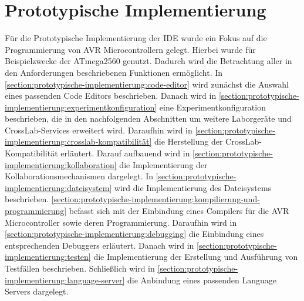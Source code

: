 \chapter{Prototypische Implementierung}\label{section:prototypische-implementierung}

Für die Prototypische Implementierung der IDE wurde ein Fokus auf die Programmierung von AVR Microcontrollern \cite{noauthor_avr_nodate} gelegt. Hierbei wurde für Beispielzwecke der ATmega2560 \cite{noauthor_atmega2560_nodate} genutzt. Dadurch wird die Betrachtung aller in den Anforderungen beschriebenen Funktionen ermöglicht. In \autoref{section:prototypische-implementierung:code-editor} wird zunächst die Auswahl eines passenden Code Editors beschrieben. Danach wird in \autoref{section:prototypische-implementierung:experimentkonfiguration} eine Experimentkonfiguration beschrieben, die in den nachfolgenden Abschnitten um weitere Laborgeräte und CrossLab-Services erweitert wird. Daraufhin wird in \autoref{section:prototypische-implementierung:crosslab-kompatibilität} die Herstellung der CrossLab-Kompatibilität erläutert. Darauf aufbauend wird in \autoref{section:prototypische-implementierung:kollaboration} die Implementierung der Kollaborationsmechanismen dargelegt. In \autoref{section:prototypische-implementierung:dateisystem} wird die Implementierung des Dateisystems beschrieben. \autoref{section:prototypische-implementierung:kompilierung-und-programmierung} befasst sich mit der Einbindung eines Compilers für die AVR Microcontroller sowie deren Programmierung. Daraufhin wird in \autoref{section:prototypische-implementierung:debugging} die Einbindung eines entsprechenden Debuggers erläutert. Danach wird in \autoref{section:prototypische-implementierung:testen} die Implementierung der Erstellung und Ausführung von Testfällen beschrieben. Schließlich wird in \autoref{section:prototypische-implementierung:language-server} die Anbindung eines passenden Language Servers dargelegt.









